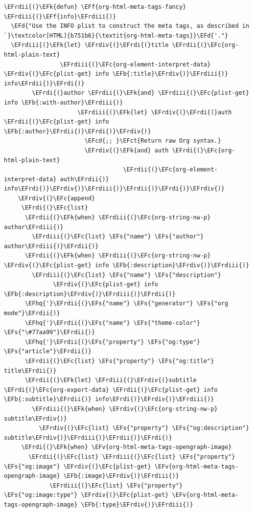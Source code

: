 \documentclass{scrartcl}
\newcommand{\EFk}[1]{\textcolor{EFk}{#1}} %
\newcommand{\EFd}[1]{\textcolor{EFd}{\textit{#1}}} %
\newcommand{\EFs}[1]{\textcolor{EFs}{#1}} %
\newcommand{\EFb}[1]{\textcolor{EFb}{#1}} %
\newcommand{\EFct}[1]{\textcolor{EFct}{#1}} %
\newcommand{\EFc}[1]{\textcolor{EFc}{#1}} %
\newcommand{\EFv}[1]{\textcolor{EFv}{#1}} %
\newcommand{\EFf}[1]{\textcolor{EFf}{#1}} %
\newcommand{\EFcd}[1]{\textcolor{EFcd}{#1}} %
\newcommand{\EFhq}[1]{\textcolor{EFhq}{#1}} %
\newcommand{\EFrdi}[1]{\textcolor{EFrdi}{#1}} %
\newcommand{\EFrdii}[1]{\textcolor{EFrdii}{#1}} %
\newcommand{\EFrdiii}[1]{\textcolor{EFrdiii}{#1}} %
\newcommand{\EFrdiv}[1]{\textcolor{EFrdiv}{#1}} %
\begin{document}
\begin{Code}
\begin{Verbatim}[]
\EFrdii{(}\EFk{defun} \EFf{org-html-meta-tags-fancy} \EFrdiii{(}\EFf{info}\EFrdiii{)}
  \EFd{"Use the INFO plist to construct the meta tags, as described in `}\textcolor[HTML]{b751b6}{\textit{org-html-meta-tags}}\EFd{'."}
  \EFrdiii{(}\EFk{let} \EFrdiv{(}\EFrdi{(}title \EFrdii{(}\EFc{org-html-plain-text}
                \EFrdiii{(}\EFc{org-element-interpret-data} \EFrdiv{(}\EFc{plist-get} info \EFb{:title}\EFrdiv{)}\EFrdiii{)} info\EFrdii{)}\EFrdi{)}
        \EFrdi{(}author \EFrdii{(}\EFk{and} \EFrdiii{(}\EFc{plist-get} info \EFb{:with-author}\EFrdiii{)}
                     \EFrdiii{(}\EFk{let} \EFrdiv{(}\EFrdi{(}auth \EFrdii{(}\EFc{plist-get} info \EFb{:author}\EFrdii{)}\EFrdi{)}\EFrdiv{)}
                       \EFcd{;; }\EFct{Return raw Org syntax.}
                       \EFrdiv{(}\EFk{and} auth \EFrdi{(}\EFc{org-html-plain-text}
                                  \EFrdii{(}\EFc{org-element-interpret-data} auth\EFrdii{)} info\EFrdi{)}\EFrdiv{)}\EFrdiii{)}\EFrdii{)}\EFrdi{)}\EFrdiv{)}
    \EFrdiv{(}\EFc{append}
     \EFrdi{(}\EFc{list}
      \EFrdii{(}\EFk{when} \EFrdiii{(}\EFc{org-string-nw-p} author\EFrdiii{)}
        \EFrdiii{(}\EFc{list} \EFs{"name"} \EFs{"author"} author\EFrdiii{)}\EFrdii{)}
      \EFrdii{(}\EFk{when} \EFrdiii{(}\EFc{org-string-nw-p} \EFrdiv{(}\EFc{plist-get} info \EFb{:description}\EFrdiv{)}\EFrdiii{)}
        \EFrdiii{(}\EFc{list} \EFs{"name"} \EFs{"description"}
              \EFrdiv{(}\EFc{plist-get} info \EFb{:description}\EFrdiv{)}\EFrdiii{)}\EFrdii{)}
      \EFhq{'}\EFrdii{(}\EFs{"name"} \EFs{"generator"} \EFs{"org mode"}\EFrdii{)}
      \EFhq{'}\EFrdii{(}\EFs{"name"} \EFs{"theme-color"} \EFs{"\#77aa99"}\EFrdii{)}
      \EFhq{'}\EFrdii{(}\EFs{"property"} \EFs{"og:type"} \EFs{"article"}\EFrdii{)}
      \EFrdii{(}\EFc{list} \EFs{"property"} \EFs{"og:title"} title\EFrdii{)}
      \EFrdii{(}\EFk{let} \EFrdiii{(}\EFrdiv{(}subtitle \EFrdi{(}\EFc{org-export-data} \EFrdii{(}\EFc{plist-get} info \EFb{:subtitle}\EFrdii{)} info\EFrdi{)}\EFrdiv{)}\EFrdiii{)}
        \EFrdiii{(}\EFk{when} \EFrdiv{(}\EFc{org-string-nw-p} subtitle\EFrdiv{)}
          \EFrdiv{(}\EFc{list} \EFs{"property"} \EFs{"og:description"} subtitle\EFrdiv{)}\EFrdiii{)}\EFrdii{)}\EFrdi{)}
     \EFrdi{(}\EFk{when} \EFv{org-html-meta-tags-opengraph-image}
       \EFrdii{(}\EFc{list} \EFrdiii{(}\EFc{list} \EFs{"property"} \EFs{"og:image"} \EFrdiv{(}\EFc{plist-get} \EFv{org-html-meta-tags-opengraph-image} \EFb{:image}\EFrdiv{)}\EFrdiii{)}
             \EFrdiii{(}\EFc{list} \EFs{"property"} \EFs{"og:image:type"} \EFrdiv{(}\EFc{plist-get} \EFv{org-html-meta-tags-opengraph-image} \EFb{:type}\EFrdiv{)}\EFrdiii{)}

\end{Verbatim}
\end{Code}
\end{document}
